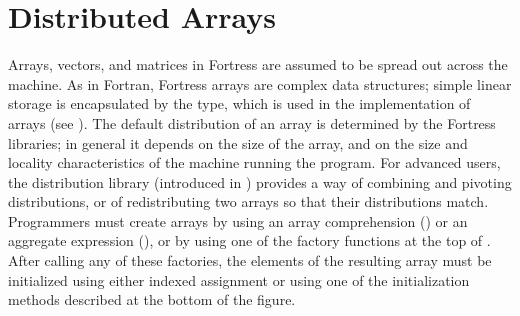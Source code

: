 %
%
%
%

\section{Distributed Arrays}


Arrays, vectors, and matrices in Fortress are assumed to be spread out
across the machine.  As in Fortran, Fortress arrays are complex data
structures; simple linear storage is encapsulated by the
 type, which is used in the implementation of arrays
(see ).
The default distribution of
an array is determined by the Fortress libraries; in general it
depends on the size of the array, and on the size and locality
characteristics of the machine running the program.
For advanced
users, the distribution library (introduced in )
provides a way of combining and pivoting distributions, or of
redistributing two arrays so that their distributions match.
Programmers must create arrays by using
an array comprehension () or
an aggregate expression (), or by using one of
the factory functions at the top of .  After calling
any of these factories, the elements of the resulting array must be
initialized using either indexed assignment or using one of the
initialization methods described at the bottom of the figure.

